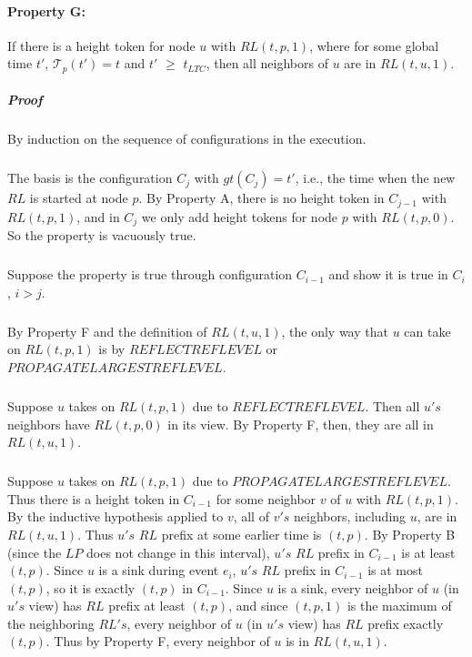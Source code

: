 \paragraph{Property G:} If there is a height token for node $u$ with $RL (t, p, 1)$, where for some global time $t '$, $\mathcal{T}_p(t') = t$ and $t '$ $\geq$ $t_{LTC}$, then all neighbors of $u$ are in $RL (t, u, 1)$.
\subparagraph{Proof} By induction on the sequence of configurations in the execution.
\subparagraph{}The basis is the configuration $C_j$ with $gt(C_j ) = t '$, i.e., the time when the new $RL$ is started at node $p$. By Property A, there is no height token in $C_{j-1}$ with $RL (t, p, 1)$, and in $C_j$ we only add height tokens for node $p$ with $RL (t, p, 0)$. So the property is vacuously true.
\subparagraph{}Suppose the property is true through configuration $C_{i-1}$ and show it is true in $C_i$, $i > j$.
\subparagraph{}By Property F and the definition of $RL (t, u, 1)$, the only way that $u$ can take on $RL (t, p, 1)$ is by $REFLECTREFLEVEL$ or $PROPAGATELARGESTREFLEVEL$.
\subparagraph{}Suppose $u$ takes on $RL (t, p, 1)$ due to $REFLECTREFLEVEL$. Then all $u's$ neighbors have $RL (t, p, 0)$ in its view. By Property F, then, they are all in $RL (t, u, 1)$.
\subparagraph{}Suppose $u$ takes on $RL (t, p, 1)$ due to $PROPAGATELARGESTREFLEVEL$. Thus there is a height token in $C_{i-1}$ for some neighbor $v$ of $u$ with $RL (t, p, 1)$. By the inductive hypothesis applied to $v$, all of $v's$ neighbors, including $u$, are in $RL (t, u, 1)$. Thus $u's$ $RL$ prefix at some earlier time is $(t, p)$. By Property B (since the $LP$ does not change in this interval), $u's$ $RL$ prefix in $C_{i-1}$ is at least $(t, p)$. Since $u$ is a sink during event $e_i$, $u's$ $RL$ prefix in $C_{i-1}$ is at most $(t, p)$, so it is exactly $(t, p)$ in $C_{i-1}$. Since $u$ is a sink, every neighbor of $u$ (in $u's$ view) has $RL$ prefix at least $(t, p)$, and since $(t, p, 1)$ is the maximum of the neighboring $RL's$, every neighbor of $u$ (in $u's$ view) has $RL$ prefix exactly $(t, p)$. Thus by Property F, every neighbor of $u$ is in $RL (t, u, 1)$.
